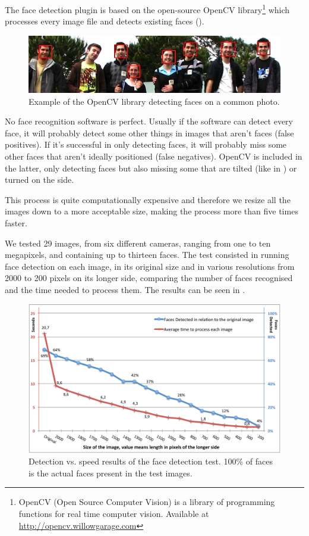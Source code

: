 The face detection plugin is based on the open-source OpenCV library\footnote{OpenCV (Open Source Computer Vision) is a library of programming functions for real time computer vision. Available at \url{http://opencv.willowgarage.com}} which processes every image file and detects existing faces ().
 
\begin{figure}[ht]
	\centering
		\includegraphics[width=\columnwidth]{Figures/faces1.jpg}
	\caption{Example of the OpenCV library detecting faces on a common photo.}
	\label{fig:faces1}
\end{figure}

No face recognition software is perfect. Usually if the software can detect every face, it will probably detect some other things in images that aren't faces (false positives). If it’s successful in only detecting faces, it will probably miss some other faces that aren't ideally positioned (false negatives). OpenCV is included in the latter, only detecting faces but also missing some that are tilted (like in ) or turned on the side.


This process is quite computationally expensive and therefore we resize all the images down to a more acceptable size, making the process more than five times faster.

We tested 29 images, from six different cameras, ranging from one to ten megapixels, and containing up to thirteen faces. The test consisted in running face detection on each image, in its original size and in various resolutions from 2000 to 200 pixels on its longer side, comparing the number of faces recognised and the time needed to process them. The results can be seen in .

\begin{figure}[ht]
	\centering
		\includegraphics[width=\columnwidth]{Figures/graph2.pdf}
	\caption[Detection vs. speed results of the face detection test.]{Detection vs. speed results of the face detection test. 100\% of faces is the actual faces present in the test images.}
	\label{fig:fdres}
\end{figure}

